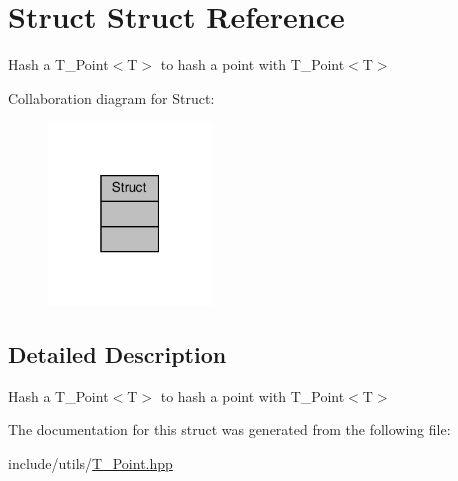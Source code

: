 \hypertarget{structStruct}{}\section{Struct Struct Reference}
\label{structStruct}


Hash a T\+\_\+\+Point$<$\+T$>$ to hash a point with T\+\_\+\+Point$<$\+T$>$  




Collaboration diagram for Struct\+:\nopagebreak
\begin{figure}[H]
\begin{center}
\leavevmode
\includegraphics[width=123pt]{structStruct__coll__graph}
\end{center}
\end{figure}


\subsection{Detailed Description}
Hash a T\+\_\+\+Point$<$\+T$>$ to hash a point with T\+\_\+\+Point$<$\+T$>$ 

The documentation for this struct was generated from the following file\+:\begin{DoxyCompactItemize}
\item 
include/utils/\hyperlink{T__Point_8hpp}{T\+\_\+\+Point.\+hpp}\end{DoxyCompactItemize}
